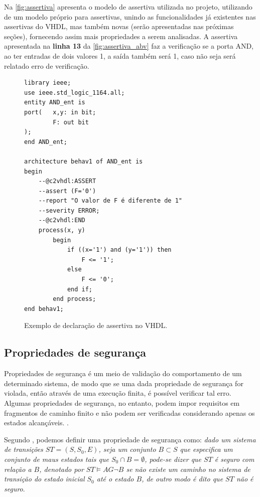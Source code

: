 \par
Na \autoref{fig:assertiva} apresenta o modelo de assertiva utilizada no projeto, utilizando de um modelo próprio para assertivas, unindo as funcionalidades já existentes nas assertivas do VHDL, mas também novas (serão apresentadas nas próximas seções), fornecendo assim mais propriedades a serem analisadas. A assertiva apresentada na \textbf{linha 13} da \autoref{fig:assertiva_abv} faz a verificação se a porta AND, ao ter entradas de dois valores 1, a saída também será 1, caso não seja será relatado erro de verificação.

\begin{figure}[H]
\caption{\label{fig:assertiva_abv} Exemplo de declaração de assertiva no VHDL.}
	\begin{center}
    \begin{minipage}{0.9\textwidth}
    \begin{lstlisting}       
library ieee;
use ieee.std_logic_1164.all;
entity AND_ent is
port(   x,y: in bit;
        F: out bit
);
end AND_ent;

architecture behav1 of AND_ent is
begin
	--@c2vhdl:ASSERT
    --assert (F='0')
    --report "O valor de F é diferente de 1"
    --severity ERROR;
    --@c2vhdl:END
	process(x, y)
    	begin
        	if ((x='1') and (y='1')) then
            	F <= '1';
        	else
            	F <= '0';
        	end if;
    	end process;
end behav1;

\end{lstlisting}
    \end{minipage}
	\end{center}
\end{figure}

\subsection{Propriedades de segurança}

Propriedades de segurança é um meio de validação do comportamento de um determinado sistema, de modo que se uma dada propriedade de segurança for violada, então através de uma execução finita, é possível verificar tal erro. Algumas propriedades de segurança, no entanto, podem impor requisitos em fragmentos de caminho finito e não podem ser verificadas considerando apenas os estados alcançáveis. \cite{baier2008principles}.

\par
Segundo \cite{clarke2003verification}, podemos definir uma propriedade de segurança como: \textit{dado um sistema de transições $ST = (S, S_0, E)$, seja um conjunto $B \subset S$ que especifica um conjunto de maus estados tais que $S_0 \cap B = \emptyset$, pode-se dizer que $ST$ é seguro com relação a $B$, denotado por $ST \models AG\neg B$ se não existe um caminho no sistema de transição do estado inicial $S_0$ até o estado $B$, de outro modo é dito que $ST$ não é seguro}.

